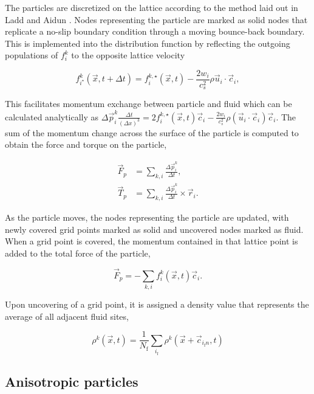 The particles are discretized on the lattice according to the method laid out in Ladd and Aidun 
\cite{ladd_lattice-boltzmann_2001}. Nodes representing the particle are marked as solid nodes that replicate
a no-slip boundary condition through a moving bounce-back boundary. This is implemented into the distribution function
by reflecting the outgoing populations of $f_i^k$ to the opposite lattice velocity

\begin{equation}
    f^k_{i^\star}(\vec{x}, t+\Delta t) = f^{k,\star}_i(\vec{x}, t) - \frac{2w_i}{c_s^2} \rho \vec{u}_i \cdot \vec{c}_i ,
\end{equation}

This facilitates momentum exchange between particle and fluid which can be calculated analytically as 
\(\Delta\vec{p}^k_i \frac{\Delta t}{(\Delta x)^3} = 2 f^{k,\star}_i(\vec{x},t)\vec{c}_i - \frac{2w_i}{c_s^2}\rho(\vec{u}_i\cdot\vec{c}_i)\vec{c}_i\).
The sum of the momentum change across the surface of the particle is computed to obtain the force and torque on the particle,

\begin{equation}
    \begin{split}
    \vec{F}_p &= \sum_{k,i} \frac{\Delta \vec{p}^k_i}{\Delta t} , \\
    \vec{T}_p &= \sum_{k,i} \frac{\Delta\vec{p}^k_i}{\Delta t} \times \vec{r}_i .
    \end{split}
\end{equation}

As the particle moves, the nodes representing the particle are updated, with newly covered grid points marked as solid and 
uncovered nodes marked as fluid. When a grid point is covered, the momentum contained in that lattice point is added to the 
total force of the particle,

\begin{equation}
    \vec{F}_p = -\sum_{k,i} f_i^k(\vec{x},t)\vec{c}_i .
\end{equation}

Upon uncovering of a grid point, it is assigned a density value that represents the average of all adjacent fluid sites,

\begin{equation}
    \rho^k(\vec{x},t) = \frac{1}{N_{\text{f}}} \sum_{i_{\text{f}}} \rho^k(\vec{x}+\vec{c}_{i_{\text{f}}n}, t)
    \label{eq:fill_particles}
\end{equation}

\subsection{Anisotropic particles}
\label{section:lbm_colloids_ellipsoids}

